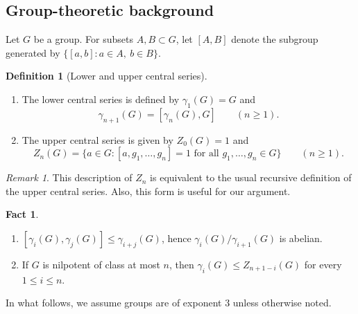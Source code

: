 \documentclass[11pt,reqno]{article}
\theoremstyle{definition}
\newtheorem{definition}[theorem]{Definition}
\newtheorem{fact}[theorem]{Fact}
\theoremstyle{remark}
\newtheorem{remark}[theorem]{Remark}
\begin{document}
\subsection{Group-theoretic background}
Let $G$ be a group.
For subsets $A,B\subset G$, let $[A,B]$ denote the subgroup generated by
$\{[a,b]:a\in A,\ b\in B\}$.
\begin{definition}[Lower and upper central series]
    \begin{enumerate}
        \item The lower central series is defined by $\gamma_1(G)=G$ and
        \[
            \gamma_{n+1}(G)=[\gamma_n(G),G] \qquad (n\geq 1).
        \]
        \item The upper central series is given by $Z_0(G)=1$ and
        \[
            Z_n(G)=\{a\in G:[a,g_1,\ldots,g_n]=1
            \text{ for all }g_1,\ldots,g_n\in G\}
            \qquad (n\geq 1).
        \]
    \end{enumerate}
\end{definition}
\begin{remark}
    This description of $Z_n$ is equivalent to the usual recursive definition of the upper central series. Also, this form is useful for our argument.
\end{remark}

\begin{fact}
    \begin{enumerate}
        \item $[\gamma_i(G),\gamma_j(G)]\leq \gamma_{i+j}(G)$, hence $\gamma_i(G)/\gamma_{i+1}(G)$ is abelian.
        \item If $G$ is nilpotent of class at most $n$, then $\gamma_i(G)\leq Z_{n+1-i}(G)$ for every $1\leq i\leq n$.
    \end{enumerate}
\end{fact}



In what follows, we assume groups are of exponent $3$ unless otherwise noted.
\end{document}
